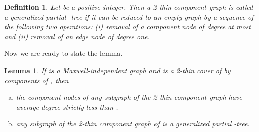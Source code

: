\documentclass[10pt]{article}
\newtheorem{lem}{Lemma}
\newtheorem{dfn}{Definition}
\begin{document}
\medskip
\noindent
\begin{dfn}\label{dfn:comppartialmTree}
Let  be a positive integer. Then a 2-thin component graph is called a {\em generalized partial -tree} if it can be reduced to an empty graph by a sequence of the 
following two operations: (i) removal of a component node of degree at most  and 
(ii) removal of an edge node of degree one. 
\end{dfn}



Now we are ready to state the lemma. \begin{lem}\label{lem:comb} If  is a Maxwell-independent graph and  is a 2-thin cover of  by components of , then
\begin{enumerate}[(a)]
\item \label{thm:degree}
the component nodes of any subgraph of the 2-thin component graph  have average degree strictly less than .
 \item \label{thm:9tree}
any subgraph of the 2-thin component graph  of  is a generalized partial -tree.
 \end{enumerate}
\end{lem}
\end{document}
